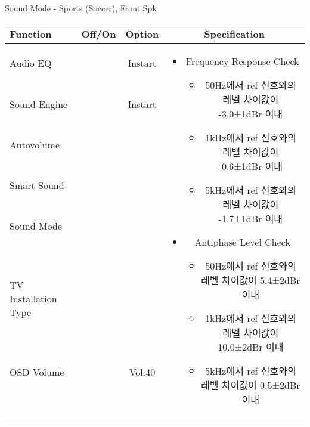 \begin{frame}[t]{Sound Mode - Sports (Soccer), Front Spk}
\begin{tiny}
\begin{tabular}{@{}lccc@{}}
\toprule
Function & Off/On & Option & Specification \\
\midrule
Audio EQ & \color{black}{Off} & Instart &
\multirow{10}{60mm}{
\begin{itemize}
\item Frequency Response Check
	\begin{itemize}
	\item 50Hz에서 ref 신호와의 레벨 차이값이 -3.0±1dBr 이내
	\item 1kHz에서 ref 신호와의 레벨 차이값이 -0.6±1dBr 이내
	\item 5kHz에서 ref 신호와의 레벨 차이값이 -1.7±1dBr 이내
	\end{itemize}
\item Antiphase Level Check
	\begin{itemize}
	\item 50Hz에서 ref 신호와의 레벨 차이값이 5.4±2dBr 이내
	\item 1kHz에서 ref 신호와의 레벨 차이값이 10.0±2dBr 이내
	\item 5kHz에서 ref 신호와의 레벨 차이값이 0.5±2dBr 이내
	\end{itemize}
\end{itemize}
} \\
Sound Engine & \color{blue}{On} & Instart & \\
Autovolume & \color{black}{Off} & & \\
Smart Sound & \color{black}{Off} & & \\
Sound Mode & \color{blue}{On} & \color{blue}{Sports} & \\
TV Installation Type & \color{blue}{On} & \color{black}{Standtype1} & \\
OSD Volume & \color{blue}{On} & Vol.40 & \\
& & & \\
& & & \\
& & & \\
& & & \\
\midrule
\end{tabular}
\end{tiny}


\end{frame}



